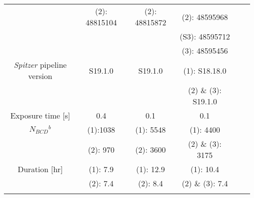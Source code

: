 \documentclass[traditabstract]{aa}
\begin{document}
\begin{appendix}
\begin{table*}
\begin{center}
{\begin{tabular}{cccccc}
                                                                           & (2): 48815104                      &  (2): 48815872            & (2): 48595968                     & &   \\ \noalign {\smallskip} 
                                                                           &                                              &                                   & (S3): 48595712                      & &   \\ \noalign {\smallskip} 
                                                                           &                                              &                                   & (3): 48595456                     & &   \\ \noalign {\smallskip} 
{\it Spitzer} pipeline version                               & S19.1.0                                 & S19.1.0                       & (1): S18.18.0                              & &   \\ \noalign {\smallskip}     
                                                                           &                                              &                                     & (2) \& (3): S19.1.0                               & &   \\ \noalign {\smallskip}     
Exposure time [s]                                               & 0.4                                       & 0.1                                & 0.1                               & &   \\ \noalign {\smallskip} 
$N_{BCD}$$^b$                                                & (1):1038                         & (1): 5548                       & (1): 4400                             & &  \\ \noalign {\smallskip} 
                                                                           &  (2): 970                                           & (2): 3600                       & (2) \& (3): 3175                      & &  \\ \noalign {\smallskip} 
Duration  [hr]                                                      & (1): 7.9                                      & (1):  12.9                      & (1): 10.4                               & &   \\ \noalign {\smallskip}  
                                                                           &  (2): 7.4                                           & (2):  8.4                        & (2) \& (3): 7.4                             & &  \\ \noalign {\smallskip} 
$$
\end{tabular}}
\end{center}
\end{table*}
\end{appendix}
\end{document}
